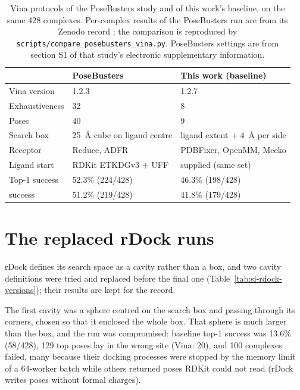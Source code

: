 \documentclass[11pt]{article}
\begin{document}
\begin{table}[h]
  \centering
  \caption{Vina protocols of the PoseBusters study \citep{buttenschoen2024posebusters} and
    of this work's baseline, on the same 428 complexes. Per-complex results of the
    PoseBusters run are from its Zenodo record \citep{posebusters2023data}; the comparison
    is reproduced by \texttt{scripts/compare\_posebusters\_vina.py}. PoseBusters settings
    are from section S1 of that study's electronic supplementary information.}
  \label{tab:si-protocols}
  \small
  \begin{tabular}{lll}
    \toprule
    & PoseBusters & This work (baseline) \\
    \midrule
    Vina version & 1.2.3 & 1.2.7 \\
    Exhaustiveness & 32 & 8 \\
    Poses & 40 & 9 \\
    Search box & \SI{25}{\angstrom} cube on ligand centre & ligand extent + \SI{4}{\angstrom} per side \\
    Receptor & Reduce, ADFR & PDBFixer, OpenMM, Meeko \\
    Ligand start & RDKit ETKDGv3 + UFF & supplied (same set) \\
    \midrule
    Top-1 success & 52.3\% (224/428) & 46.3\% (198/428) \\
    \pbvalid{} success & 51.2\% (219/428) & 41.8\% (179/428) \\
    \bottomrule
  \end{tabular}
\end{table}

\section{The replaced rDock runs}

rDock defines its search space as a cavity rather than a box, and two cavity definitions
were tried and replaced before the final one (Table~\ref{tab:si-rdock-versions}); their
results are kept for the record.

The first cavity was a sphere centred on the search box and passing through its corners,
chosen so that it enclosed the whole box. That sphere is much larger than the box, and the
run was compromised: baseline top-1 success was 13.6\% (58/428), 129 top poses lay in the
wrong site (Vina: 20), and 100 complexes failed, many because their docking processes were
stopped by the memory limit of a 64-worker batch while others returned poses RDKit could
not read (rDock writes poses without formal charges).
\end{document}
